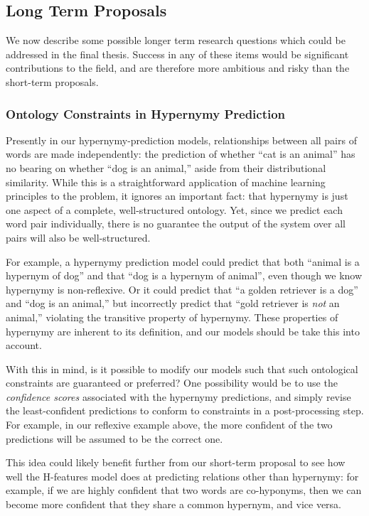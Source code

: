 \documentclass[12pt]{article}
\begin{document}
\subsection{Long Term Proposals}

We now describe some possible longer term research questions which could be
addressed in the final thesis. Success in any of these items would
be significant contributions to the field, and are therefore more ambitious and
risky than the short-term proposals.

\subsubsection{Ontology Constraints in Hypernymy Prediction}

Presently in our hypernymy-prediction models, relationships between all
pairs of words are made independently: the prediction of whether ``cat is an
animal'' has no bearing on whether ``dog is an animal,'' aside from their
distributional similarity. While this is a straightforward application of
machine learning principles to the problem, it ignores an important fact: that
hypernymy is just one aspect of a complete, well-structured ontology.
Yet, since we predict each word pair individually, there is no
guarantee the output of the system over all pairs will also be
well-structured.

For example, a hypernymy prediction model could predict that both ``animal is a
hypernym of dog'' and that ``dog is a hypernym of animal'', even though we know
hypernymy is non-reflexive. Or it could predict that ``a golden retriever is a
dog'' and ``dog is an animal,'' but incorrectly predict that ``gold retriever is
{\em not} an animal,'' violating the transitive property of hypernymy. These
properties of hypernymy are inherent to its definition, and our models
should be take this into account.

With this in mind, is it possible to modify our models such that such
ontological constraints are guaranteed or preferred? One
possibility would be to use the {\em confidence scores} associated with the
hypernymy predictions, and simply revise the least-confident predictions to
conform to constraints in a post-processing step. For example, in our reflexive example
above, the more confident of the two predictions will be assumed to be
the correct one.

This idea could likely benefit further from our short-term proposal to
see how well the H-features model does at predicting relations other
than hypernymy: for example, if we are highly confident that two words are
co-hyponyms, then we can become more confident that they share a common
hypernym, and vice versa.
\end{document}
